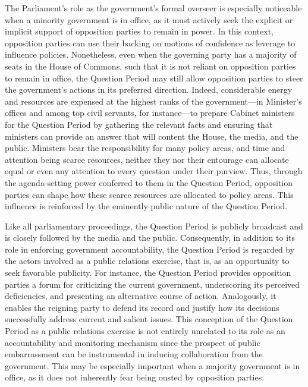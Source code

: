 {{The Parliament's role as the government’s formal overseer is especially noticeable when a minority government is in office, as it must actively seek the explicit or implicit support of opposition parties to remain in power. In this context, opposition parties can use their backing on motions of confidence as leverage to influence policies. Nonetheless, even when the governing party has a majority of seats in the House of Commons, such that it is not reliant on opposition parties to remain in office, the Question Period may still allow opposition parties to steer the government’s actions in its preferred direction. Indeed, considerable energy and resources are expensed at the highest ranks of the government---in Minister's offices and among top civil servants, for instance---to prepare Cabinet ministers for the Question Period by gathering the relevant facts and ensuring that ministers can provide an answer that will content the House, the media, and the public. Ministers bear the responsibility for many policy areas, and time and attention being scarce resources, neither they nor their entourage can allocate equal or even any attention to every question under their purview. Thus, through the agenda-setting power conferred to them in the Question Period, opposition parties can shape how these scarce resources are allocated to policy areas. This influence is reinforced by the eminently public nature of the Question Period.

Like all parliamentary proceedings, the Question Period is publicly broadcast and is closely followed by the media and the public. Consequently, in addition to its role in enforcing government accountability, the Question Period is regarded by the actors involved as a public relations exercise, that is, as an opportunity to seek favorable publicity. For instance, the Question Period provides opposition parties a forum for criticizing the current government, underscoring its perceived deficiencies, and presenting an alternative course of action. Analogously, it enables the reigning party to defend its record and justify how its decisions successfully address current and salient issues. This conception of the Question Period as a public relations exercise is not entirely unrelated to its role as an accountability and monitoring mechanism since the prospect of public embarrassment can be instrumental in inducing collaboration from the government. This may be especially important when a majority government is in office, as it does not inherently fear being ousted by opposition parties.

}}
